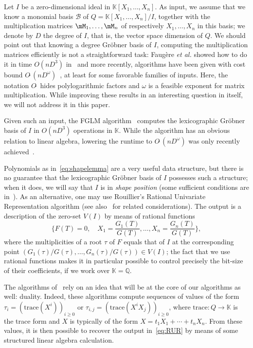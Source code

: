 \documentclass[12pt]{article}
\newcommand{\basis}{\mathscr{B}}
\newcommand{\trace}{\mathrm{trace}}
\newcommand{\softO}[1]{O{\tilde{~}}(#1)} %
\newcommand{\lf}{X}
\def\Q {\ensuremath{\mathbb{Q}}}
\def\K{\mathbb{K}}
\def\K {\ensuremath{\mathbb{K}}}
\begin{document}
 Let $I$ be a zero-dimensional ideal in $\K[X_1,\dots,X_n]$.  As
 input, we assume that we know a monomial basis $\basis$ of
 $Q=\K[X_1,\dots,X_n]/I$, together with the multiplication matrices
 $\mM_1,\dots,\mM_n$ of respectively $X_1,\dots,X_n$ in this basis; we
 denote by $D$ the degree of $I$, that is, the vector space dimension
 of $Q$. We should point out that knowing a degree Gr\"obner basis of
 $I$, computing the multiplication matrices efficiently is not a
 straightforward task: Faug\`ere {\it et al.} showed how to do it in
 time $O(nD^3)$ in~\cite{FaGiLaMo93} and more recently, algorithms have
 been given with cost bound
 $\softO{nD^\omega}$~\cite{FaGaHuRe13,FaGaHuRe14,Neiger16}, at
 least for some favorable families of inputs. Here, the notation
 $O\tilde{~}$ hides polylogarithmic factors and $\omega$ is a feasible
 exponent for matrix multiplication. While improving these results in
 an interesting question in itself, we will not address it in this
 paper.

Given such an input, the FGLM algorithm~\cite{FaGiLaMo93} computes the
lexicographic Gr\"obner basis of $I$ in $O(nD^3)$ operations in $\K$.
While the algorithm has an obvious relation to linear algebra,
lowering the runtime to $O\tilde{~}(nD^\omega)$ was only recently
achieved~\cite{FaGaHuRe13,FaGaHuRe14,Neiger16}. 

Polynomials as in~\eqref{eq:shapelemma} are a very useful data
structure, but there is no guarantee that the lexicographic Gr\"obner
basis of $I$ possesses such a structure; when it does, we will say
that $I$ is in {\em shape position} (some sufficient conditions are
in~\cite{BeMoMaTr94}). As an alternative, one may use Rouillier's
Rational Univariate Representation algorithm \cite{Rouillier99} (see
also~\cite{AlBeRoWo94,BeWo96} for related considerations). The output
is a description of the zero-set $V(I)$ by means of rational functions
\begin{equation}\label{eq:RUR}
 \{  F(T)=0, \quad X_1 = \frac{G_1(T)}{G(T)}, \dots,X_n = \frac{G_n(T)}{G(T)} \},
\end{equation}
where the multiplicities of a root $\tau$ of $F$ equals that of
$I$ at the corresponding point
$(G_1(\tau)/G(\tau),\dots,G_n(\tau)/G(\tau)) \in V(I)$; the fact that
we use rational functions makes it in particular possible to control
precisely the bit-size of their coefficients, if we work over $\K=\Q$.

The algorithms of~\cite{AlBeRoWo94, BeWo96, Rouillier99} rely on an
idea that will be at the core of our algorithms as well: duality.
Indeed, these algorithms compute sequences of values of the form
$\tau_i=(\trace(\lf^i))_{i \ge 0}$ or 
$\tau_{i,j}=(\trace(\lf^i X_j))_{i \ge 0}$, where $\trace: Q \to \K$ is the trace 
form and $\lf$ is typically of the form $\lf=t_1 X_1 + \cdots + t_n X_n$.
From these values, it is then possible to recover the output
in~\eqref{eq:RUR} by means of some structured linear algebra calculation.
\end{document}
